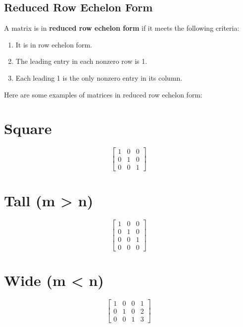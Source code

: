 \documentclass[
  letterpaper,
  DIV=11,
  numbers=noendperiod]{scrreprt}
\providecommand{\tightlist}{%
  \setlength{\itemsep}{0pt}\setlength{\parskip}{0pt}}\usepackage{longtable,booktabs,array}
\begin{document}
\hypertarget{reduced-row-echelon-form}{%
\section*{Reduced Row Echelon Form}\label{reduced-row-echelon-form}}


A matrix is in \textbf{reduced row echelon form} if it meets the
following criteria:

\begin{enumerate}
\def\labelenumi{\arabic{enumi}.}
\tightlist
\item
  It is in row echelon form.
\item
  The leading entry in each nonzero row is 1.
\item
  Each leading 1 is the only nonzero entry in its column.
\end{enumerate}

Here are some examples of matrices in reduced row echelon form:

\chapter{Square}

\[
\begin{bmatrix}
    1 & 0 & 0 \\
    0 & 1 & 0 \\
    0 & 0 & 1 
\end{bmatrix}
\]

\chapter{Tall (m \textgreater{} n)}

\[
\begin{bmatrix}
    1 & 0 & 0 \\
    0 & 1 & 0 \\
    0 & 0 & 1 \\
    0 & 0 & 0
\end{bmatrix}
\]

\chapter{Wide (m \textless{} n)}

\[
\begin{bmatrix}
  1 & 0 & 0 & 1 \\
  0 & 1 & 0 & 2 \\
  0 & 0 & 1 & 3
\end{bmatrix}
\]
\end{document}
